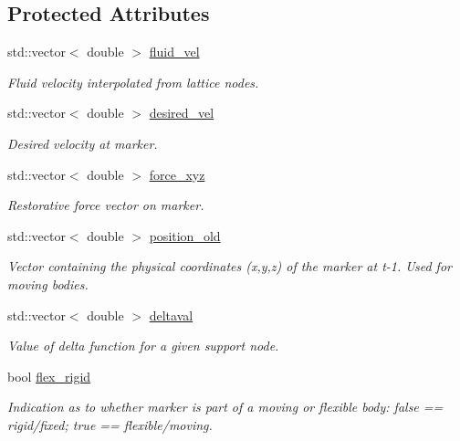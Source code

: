 \subsection*{Protected Attributes}
\begin{DoxyCompactItemize}
\item 
std\+::vector$<$ double $>$ \hyperlink{class_i_b_marker_aa31ccf45de61bfccc60876ac9e98909a}{fluid\+\_\+vel}
\begin{DoxyCompactList}\small\item\em Fluid velocity interpolated from lattice nodes. \end{DoxyCompactList}\item 
std\+::vector$<$ double $>$ \hyperlink{class_i_b_marker_ad9535b494684533ace9a9523c4df26bf}{desired\+\_\+vel}
\begin{DoxyCompactList}\small\item\em Desired velocity at marker. \end{DoxyCompactList}\item 
std\+::vector$<$ double $>$ \hyperlink{class_i_b_marker_aa8b8b23e64a8bfc4051b95ebf9ccb767}{force\+\_\+xyz}
\begin{DoxyCompactList}\small\item\em Restorative force vector on marker. \end{DoxyCompactList}\item 
std\+::vector$<$ double $>$ \hyperlink{class_i_b_marker_a6a55fe2293f288ae339036ea4a3bc7df}{position\+\_\+old}
\begin{DoxyCompactList}\small\item\em Vector containing the physical coordinates (x,y,z) of the marker at t-\/1. Used for moving bodies. \end{DoxyCompactList}\item 
std\+::vector$<$ double $>$ \hyperlink{class_i_b_marker_a82296e15048c55bd121245d85b076168}{deltaval}
\begin{DoxyCompactList}\small\item\em Value of delta function for a given support node. \end{DoxyCompactList}\item 
bool \hyperlink{class_i_b_marker_a826fd907814ce9c6e40bcbdbd359ec7e}{flex\+\_\+rigid}
\begin{DoxyCompactList}\small\item\em Indication as to whether marker is part of a moving or flexible body\+: false == rigid/fixed; true == flexible/moving. \end{DoxyCompactList}\item 

\end{DoxyCompactItemize}

